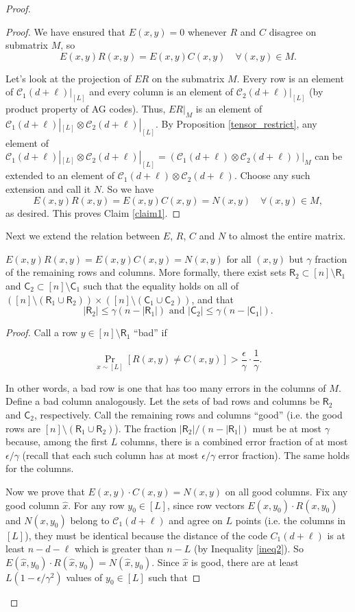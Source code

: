 \documentclass[10pt,a4paper]{amsart}
\newcommand{\Col}{\mathsf{C}}
\newcommand{\C}{\mathcal{C}}
\newcommand{\Row}{\mathsf{R}}
\renewcommand{\d}{d}
\begin{document}
\begin{proof}
\begin{proof}
We have ensured that $E(x,y) = 0$ whenever $R$ and $C$ disagree on submatrix $M$, so
$$E(x,y)R(x,y) = E(x,y)C(x,y) \quad \forall (x,y) \in M.$$

Let's look at the projection of $ER$ on the submatrix $M$. Every row is an element of $\C_1(\d + \ell)|_{[L]}$ and every column is an element of $\C_2(\d + \ell)|_{[L]}$ (by product property of AG codes). Thus, $ER|_M$ is an element of $\C_1(\d + \ell)|_{[L]} \otimes \C_2(\d + \ell)|_{[L]}$. By Proposition \ref{tensor_restrict}, any element of $\C_1(\d + \ell)|_{[L]} \otimes \C_2(\d + \ell)|_{[L]} = (\C_1(\d + \ell) \otimes \C_2(\d + \ell))|_M$ can be extended to an element of $\C_1(\d + \ell) \otimes \C_2(\d + \ell)$. Choose any such extension and call it $N$. So we have
$$E(x,y)R(x,y) = E(x,y)C(x,y) = N(x,y) \quad \forall (x,y) \in M,$$
as desired. This proves Claim \ref{claim1}.
\end{proof}
Next we extend the relation between $E$, $R$, $C$ and $N$ to almost the entire matrix.

\begin{claim}
\label{claim2}
$E(x,y)R(x,y)=E(x,y)C(x,y)=N(x,y)$ for all  $(x,y)$ but $\gamma$ fraction of the remaining rows and columns. More formally, there exist sets $\Row_2 \subset [n] \setminus \Row_1$ and $\Col_2 \subset [n] \setminus \Col_1$ such that the equality holds on all of $([n] \setminus (\Row_1 \cup \Row_2)) \times ([n] \setminus (\Col_1 \cup \Col_2))$, and  that $$|\Row_2| \leq \gamma (n- |\Row_1|) \text{ and } |\Col_2| \leq \gamma (n- |\Col_1|).$$
\end{claim}

\begin{proof}
Call a row $y \in [n] \setminus \Row_1$ ``bad'' if

$$\Pr_{x \sim [L]}[R(x,y) \neq C(x,y)] > \frac{\epsilon}{\gamma}\cdot \frac{1}{\gamma}.$$

In other words, a bad row is one that has too many errors in the columns of $M$. Define a bad column analogously. Let the sets of bad rows and columns be $\Row_2$ and $\Col_2$, respectively.
Call the remaining rows and columns ``good'' (i.e. the good rows are $[n] \setminus (\Row_1 \cup \Row_2)$). The fraction $|\Row_2|/(n - |\Row_1|)$ must be at most $\gamma$ because, among the first $L$ columns, there is a combined error fraction of at most $\epsilon/\gamma$ (recall that each such column has at most $\epsilon/\gamma$ error fraction). The same holds for the columns.

Now we prove that $E(x,y) \cdot C(x, y) = N(x, y)$ on all good columns. Fix any good column $\hat x$. For any row $y_0 \in [L]$, since  row vectors $E (x, y_0) \cdot R(x, y_0)$ and $N(x, y_0)$ belong to $\C_1(\d + \ell)$ and agree on $L$ points (i.e. the columns in $[L]$), they must be identical because the distance of the code $C_1(\d + \ell)$ is at least  $n-\d - \ell$ which is greater than $n-L$ (by Inequality \eqref{ineq2}). So $E(\hat x, y_0) \cdot R(\hat x, y_0) = N(\hat x, y_0)$. Since $\hat x$ is good, there are at least $L\left(1-\epsilon/\gamma^2\right)$ values of $y_0 \in [L]$ such that


\end{proof}
\end{proof}
\end{document}
